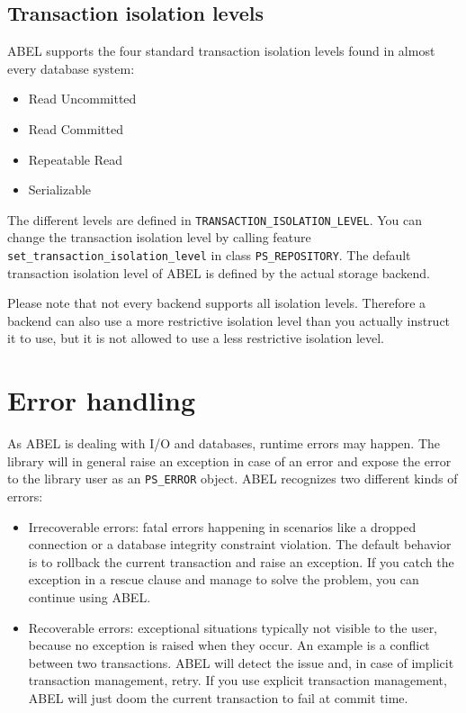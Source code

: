 \documentclass[a4paper,12pt]{report}
\begin{document}
\section{Transaction isolation levels}
ABEL supports the four standard transaction isolation levels found in almost every database system:
\begin{itemize}
 \item Read Uncommitted
 \item Read Committed
 \item Repeatable Read
 \item Serializable
\end{itemize}
The different levels are defined in \lstinline!TRANSACTION_ISOLATION_LEVEL!.
You can change the transaction isolation level by calling feature\\
 \lstinline{set_transaction_isolation_level} in class \lstinline{PS_REPOSITORY}.
The default transaction isolation level of ABEL is defined by the actual storage backend.

Please note that not every backend supports all isolation levels.
Therefore a backend can also use a more restrictive isolation level than you actually instruct it to use, but it is not allowed to use a less restrictive isolation level.

\chapter{Error handling}

As ABEL is dealing with I/O and databases, runtime errors may happen. 
The library will in general raise an exception in case of an error and expose the error to the library user as an \lstinline!PS_ERROR! object.
ABEL recognizes two different kinds of errors:

\begin{itemize}

\item Irrecoverable errors:  fatal errors happening in scenarios like a dropped connection or a database integrity constraint violation.
The default behavior is to rollback the current transaction and raise an exception. 
If you catch the exception in a rescue clause and manage to solve the problem, you can continue using ABEL.

\item Recoverable errors: exceptional situations typically not visible to the user, because no exception is raised when they occur.
An example is a conflict between two transactions.
ABEL will detect the issue and, in case of implicit transaction management, retry.
If you use explicit transaction management, ABEL will just doom the current transaction to fail at commit time.
\end{itemize}
\end{document}
